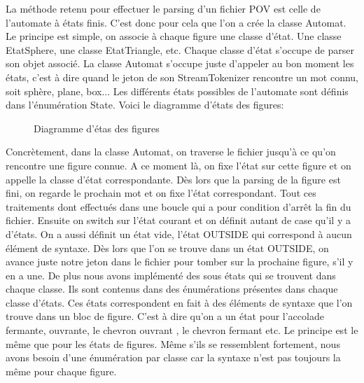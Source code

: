 \documentclass[../../Rapport RayTracer]{subfiles}
\begin{document}
La méthode retenu pour effectuer le parsing d'un fichier POV est celle de l'automate à états finis. C'est donc pour cela que l'on a crée la classe Automat. Le principe est simple, on associe à chaque figure une classe d'état. Une classe EtatSphere, une classe EtatTriangle, etc. Chaque classe d'état s'occupe de parser son objet associé. La classe Automat s'occupe juste d'appeler au bon moment les états, c'est à dire quand le jeton de son StreamTokenizer rencontre un mot connu, soit sphère, plane, box... Les différents états possibles de l'automate sont définis dans l'énumération State. 
Voici le diagramme d'états des figures:

\begin{figure}[h!]
	
	\caption{Diagramme d'étas des figures}
	\label{diagrammeEtatFigure}
\end{figure}
\FloatBarrier


Concrètement, dans la classe Automat, on traverse le fichier jusqu'à ce qu'on rencontre une figure connue. A ce moment là, on fixe l'état sur cette figure et on appelle la classe d'état correspondante. Dès lors que la parsing de la figure est fini, on regarde le prochain mot et on fixe l'état correspondant. Tout ces traitements dont effectués dans une boucle qui a pour condition d'arrêt la fin du fichier. Ensuite on switch sur l'état courant et on définit autant de case qu'il y a d'états. On a aussi définit un état vide, l'état OUTSIDE qui correspond à aucun élément de syntaxe. Dès lors que l'on se trouve dans un état OUTSIDE, on avance juste notre jeton dans le fichier pour tomber sur la prochaine figure, s'il y en a une.
De plus nous avons implémenté des sous états qui se trouvent dans chaque classe. Ils sont contenus dans des énumérations présentes dans chaque classe d'états. Ces états correspondent en fait à des éléments de syntaxe que l'on trouve dans un bloc de figure. C'est à dire qu'on a un état pour l'accolade fermante, ouvrante, le chevron ouvrant , le chevron fermant etc.
Le principe est le même que pour les états de figures. Même s'ils se ressemblent fortement, nous avons besoin d'une énumération par classe car la syntaxe n'est pas toujours la même pour chaque figure.
\\
\end{document}
